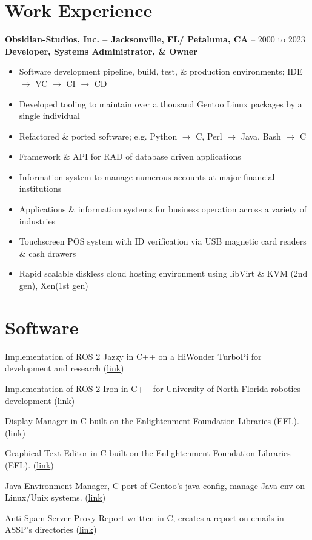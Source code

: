 \documentclass[10pt]{report}
\begin{document}
\section*{Work Experience}
\textbf{Obsidian-Studios, Inc. – Jacksonville, FL/ Petaluma, CA} – 2000 to 2023\newline
\textbf{Developer, Systems Administrator, \& Owner}
\begin{itemize}
  \item Software development pipeline, build, test, \& production environments; IDE $\rightarrow$ VC $\rightarrow$ CI $\rightarrow$ CD
  \item Developed tooling to maintain over a thousand Gentoo Linux packages by a single individual
  \item Refactored \& ported software; e.g. Python $\rightarrow$ C, Perl $\rightarrow$ Java, Bash $\rightarrow$ C
  \item Framework \& API for RAD of database driven applications
  \item Information system to manage numerous accounts at major financial institutions
  \item Applications \& information systems for business operation across a variety of industries
  \item Touchscreen POS system with ID verification via USB magnetic card readers \& cash drawers
  \item Rapid scalable diskless cloud hosting environment using libVirt \& KVM (2nd gen), Xen(1st gen)

\end{itemize}

\section*{Software}
\begin{description}[style=multiline,leftmargin=7em]
  \item [turbopi\_ros] Implementation of ROS 2 Jazzy in C++ on a HiWonder TurboPi for development and research (\href{https://github.com/wltjr/turbopi_ros}{link})
  \item [osprey\_ros] Implementation of ROS 2 Iron in C++ for University of North Florida robotics development (\href{https://github.com/Osprey-Robotics/osprey_ros}{link})
  \item [entrance] Display Manager in C built on the Enlightenment Foundation Libraries (EFL). (\href{https://github.com/Obsidian-StudiosInc/entrance}{link})
  \item [ecrire] Graphical Text Editor in C built on the Enlightenment Foundation Libraries (EFL). (\href{https://github.com/Obsidian-StudiosInc/ecrire}{link})
  \item [jem] Java Environment Manager, C port of Gentoo's java-config, manage Java env on Linux/Unix systems. (\href{https://github.com/Obsidian-StudiosInc/jem}{link})
  \item [asspr] Anti-Spam Server Proxy Report written in C, creates a report on emails in ASSP's directories (\href{https://github.com/Obsidian-StudiosInc/asspr}{link})
\end{description}
\end{document}
